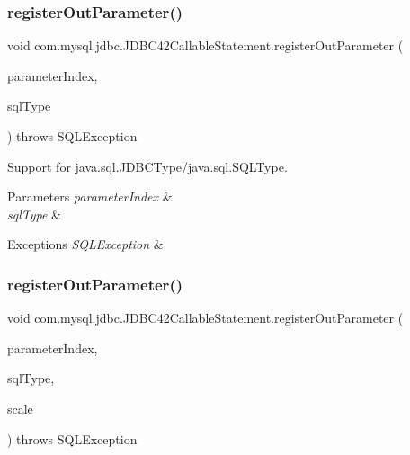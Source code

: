 \subsubsection{\texorpdfstring{register\+Out\+Parameter()}{registerOutParameter()}\hspace{0.1cm}{\footnotesize\ttfamily [1/6]}}
{\footnotesize\ttfamily void com.\+mysql.\+jdbc.\+J\+D\+B\+C42\+Callable\+Statement.\+register\+Out\+Parameter (\begin{DoxyParamCaption}\item[{int}]{parameter\+Index,  }\item[{S\+Q\+L\+Type}]{sql\+Type }\end{DoxyParamCaption}) throws S\+Q\+L\+Exception}

Support for java.\+sql.\+J\+D\+B\+C\+Type/java.sql.\+S\+Q\+L\+Type.


\begin{DoxyParams}{Parameters}
{\em parameter\+Index} & \\
\hline
{\em sql\+Type} & \\
\hline
\end{DoxyParams}

\begin{DoxyExceptions}{Exceptions}
{\em S\+Q\+L\+Exception} & \\
\hline
\end{DoxyExceptions}
\mbox{\label{classcom_1_1mysql_1_1jdbc_1_1_j_d_b_c42_callable_statement_a316397da97ae5879a951f3293a112e1d}} 
\subsubsection{\texorpdfstring{register\+Out\+Parameter()}{registerOutParameter()}\hspace{0.1cm}{\footnotesize\ttfamily [2/6]}}
{\footnotesize\ttfamily void com.\+mysql.\+jdbc.\+J\+D\+B\+C42\+Callable\+Statement.\+register\+Out\+Parameter (\begin{DoxyParamCaption}\item[{int}]{parameter\+Index,  }\item[{S\+Q\+L\+Type}]{sql\+Type,  }\item[{int}]{scale }\end{DoxyParamCaption}) throws S\+Q\+L\+Exception}

